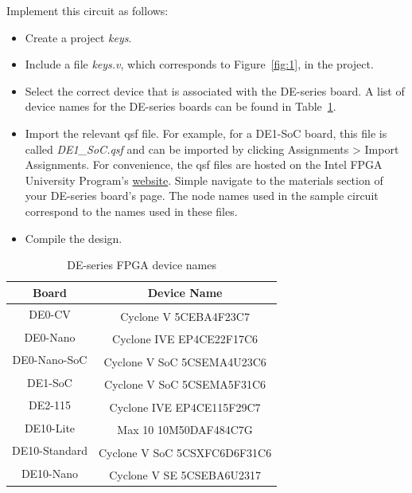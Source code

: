 \documentclass[11pt, twoside, pdftex]{article}
\begin{document}
Implement this circuit as follows:
\begin{itemize}
\item Create a project {\it keys}.
\item Include a file {\it keys.v}, which corresponds to Figure~\ref{fig:1},
in the project.
\item Select the correct device that is associated with the DE-series board. A list of device names for the DE-series boards can be found in Table~\ref{tab:device}.
\item Import the relevant qsf file. For example, for a DE1-SoC board, this file is called {\it DE1\_SoC.qsf} and can be imported by clicking {\sf Assignments > Import Assignments}. For convenience, the qsf files are hosted on the Intel FPGA University Program's \href{https://www.altera.com/support/training/university/boards.html}{website}. Simple navigate to the materials section of your DE-series board's page. The node names used in the sample circuit correspond to the names used in these files.
\item Compile the design.
\end{itemize} 

\begin{table}[H]
	\begin{center}
	\begin{tabular}{| c | c |}
	\hline
	Board & Device Name \\
	\hline
	DE0-CV & Cyclone\textsuperscript{\textregistered} V 5CEBA4F23C7 \\
	\hline
	DE0-Nano & Cyclone\textsuperscript{\textregistered} IVE EP4CE22F17C6 \\
	\hline
	DE0-Nano-SoC & Cyclone\textsuperscript{\textregistered} V SoC 5CSEMA4U23C6\\
	\hline
	DE1-SoC & Cyclone\textsuperscript{\textregistered} V SoC 5CSEMA5F31C6 \\
	\hline
	DE2-115 & Cyclone\textsuperscript{\textregistered} IVE EP4CE115F29C7 \\
	\hline
	DE10-Lite & Max\textsuperscript{\textregistered} 10 10M50DAF484C7G \\
	\hline
	DE10-Standard & Cyclone\textsuperscript{\textregistered} V SoC 5CSXFC6D6F31C6 \\
	\hline
	DE10-Nano & Cyclone\textsuperscript{\textregistered} V SE 5CSEBA6U2317 \\
	\hline
	\end{tabular}
	\caption{DE-series FPGA device names}
	\label{tab:device}
	\end{center}
\end{table}
\end{document}
